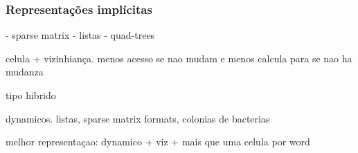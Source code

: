 \subsubsection{Representações implícitas}

- sparse matrix
- listas
- quad-trees



celula + vizinhiança. menos acesso se  nao mudam e menos calcula para se nao ha mudanza

tipo hibrido


dynamicos. listas, sparse matrix formats, colonias de bacterias

melhor representaçao: dynamico + viz + mais que uma celula por word

